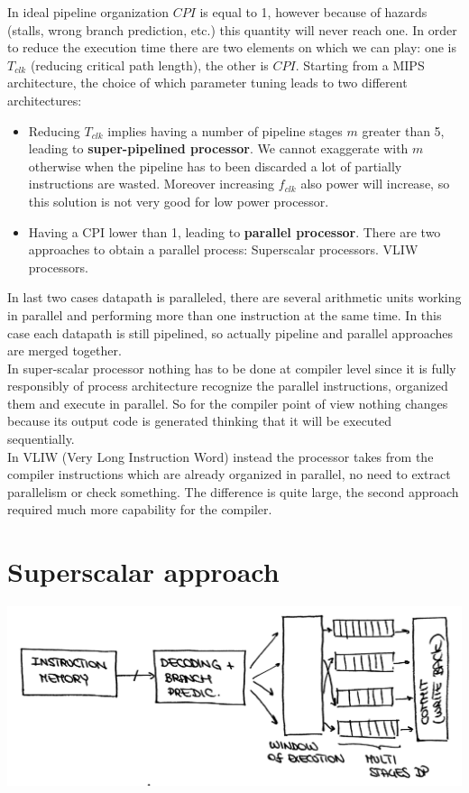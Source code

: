 In ideal pipeline organization $CPI$ is equal to 1, however because of hazards (stalls, wrong branch prediction, etc.) this quantity will never reach one. In order to reduce the execution time there are two elements on which we can play: one is $T_{clk}$ (reducing critical path length), the other is $CPI$. Starting from a MIPS architecture, the choice of which parameter tuning leads to two different architectures:
\begin{itemize}
  \item Reducing $T_{clk}$ implies having a number of pipeline stages $m$ greater than 5, leading to \textbf{super-pipelined processor}. We cannot exaggerate with $m$ otherwise when the pipeline has to been discarded a lot of partially instructions are wasted. Moreover increasing $f_{clk}$ also power will increase, so this solution is not very good for low power processor.

  \item Having a CPI lower than 1, leading to \textbf{parallel processor}. There are two approaches to obtain a parallel process:
    \subitem Superscalar processors.
    \subitem VLIW processors.

\end{itemize}

In last two cases datapath is paralleled, there are several arithmetic units working in parallel and performing more than one instruction at the same time. In this case each datapath is still pipelined, so actually pipeline and parallel approaches are merged together.\\
In super-scalar processor nothing has to be done at compiler level since it is fully responsibly of process architecture recognize the parallel instructions, organized them and execute in parallel. So for the compiler point of view nothing changes because its output code is generated thinking that it will be executed sequentially.\\
In VLIW (Very Long Instruction Word) instead the processor takes from the compiler instructions which are already organized in parallel, no need to extract parallelism or check something. The difference is quite large, the second approach required much more capability for the compiler.

\section{Superscalar approach}
\begin{center}
  \includegraphics[width=0.7\linewidth]{img/img3/3}
\end{center}

